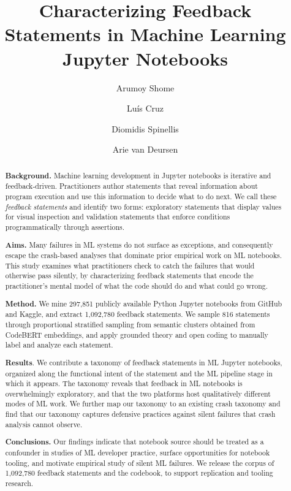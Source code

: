 \documentclass[a4paper,USenglish,cleveref,autoref,thm-restate,anonymous]{lipics-v2021}       %
\title{Characterizing Feedback Statements in Machine Learning Jupyter Notebooks}
\author{Arumoy Shome}{Delft University of Technology, The Netherlands}{a.shome@tudelft.nl}{}{}
\author{Lu\'is Cruz}{Delft University of Technology, The Netherlands}{l.cruz@tudelft.nl}{}{}
\author{Diomidis Spinellis}{Delft University of Technology, The Netherlands}{d.spinellis@tudelft.nl}{}{}
\author{Arie van Deursen}{Delft University of Technology, The Netherlands}{arie.vandeursen@tudelft.nl}{}{}
\begin{document}
\maketitle

\begin{abstract}
\textbf{Background.}
Machine learning development in Jupyter notebooks
is iterative and feedback-driven.
Practitioners author statements
that reveal information about program execution
and use this information
to decide what to do next.
We call these \emph{feedback statements}
and identify two forms:
exploratory statements that display values for visual inspection
and validation statements that enforce conditions programmatically through assertions.

\textbf{Aims.}
Many failures in ML systems do not surface as exceptions,
and consequently escape the crash-based analyses
that dominate prior empirical work on ML notebooks.
This study examines what practitioners check
to catch the failures that would otherwise pass silently,
by characterizing feedback statements
that encode the practitioner's mental model
of what the code should do
and what could go wrong.

\textbf{Method.}
We mine 297,851 publicly available Python Jupyter notebooks
from GitHub and Kaggle,
and extract 1,092,780 feedback statements.
We sample 816 statements
through proportional stratified sampling
from semantic clusters obtained from CodeBERT embeddings,
and apply grounded theory and open coding
to manually label and analyze each statement.

\textbf{Results}.
We contribute a taxonomy of feedback statements in ML Jupyter notebooks,
organized along the functional intent of the statement
and the ML pipeline stage in which it appears.
The taxonomy reveals
that feedback in ML notebooks is overwhelmingly exploratory,
and that the two platforms host qualitatively different modes of ML work.
We further map our taxonomy to an existing crash taxonomy
and find that our taxonomy captures defensive practices against silent failures
that crash analysis cannot observe.

\textbf{Conclusions.}
Our findings indicate
that notebook source should be treated
as a confounder in studies of ML developer practice,
surface opportunities for notebook tooling,
and motivate empirical study of silent ML failures.
We release the corpus of 1,092,780 feedback statements and the codebook,
to support replication and tooling research.
\end{abstract}
\end{document}
